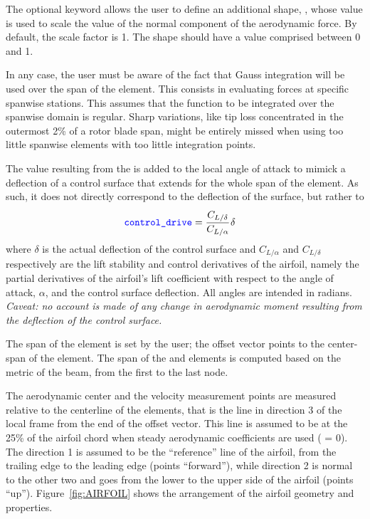 The optional  keyword allows the user to define an additional shape,
,
whose value is used to scale the value of the normal component of the aerodynamic force.
By default, the scale factor is 1.
The  shape should have a value comprised between 0 and 1.

In any case, the user must be aware of the fact that Gauss integration
will be used over the span of the element.
This consists in evaluating forces at specific spanwise stations.
This assumes that the function to be integrated over the spanwise domain
is regular.
Sharp variations, like tip loss concentrated in the outermost 2\%
of a rotor blade span, might be entirely missed when using too little
spanwise elements with too little integration points.

The value resulting from the  is added to the local angle of attack to mimick a deflection of a control surface that extends for the whole span of the element.
As such, it does not directly correspond to the deflection of the surface, but rather to
\begin{align*}
	\textcolor{blue}{\texttt{control\_drive}} &= \cfrac{C_{L/\delta}}{C_{L/\alpha}} \, \delta
\end{align*}
where $\delta$ is the actual deflection of the control surface and $C_{L/\alpha}$ and $C_{L/\delta}$ respectively are the lift stability and control derivatives of the airfoil, namely the partial derivatives of the airfoil's lift coefficient with respect to the angle of attack, $\alpha$, and the control surface deflection.  All angles are intended in radians.
\emph{Caveat: no account is made of any change in aerodynamic moment resulting from the deflection of the control surface.}

The span of the  element is set by the user;
the offset vector points to the center-span of the element.
The span of the  and  elements
is computed based on the metric of the beam, from the first to the last node.

The aerodynamic center and the velocity measurement points are measured
relative to the centerline of the elements, that is the line in direction 3
of the local frame from the end of the offset vector.
This line is assumed to be at the 25\% of the airfoil chord when steady
aerodynamic coefficients are used ( = 0).
The direction 1 is assumed to be the ``reference'' line of the airfoil,
from the trailing edge to the leading edge (points ``forward''),
while direction 2 is normal to the other two and goes from the lower
to the upper side of the airfoil (points ``up'').
Figure~\ref{fig:AIRFOIL} shows the arrangement of the airfoil geometry
and properties.

